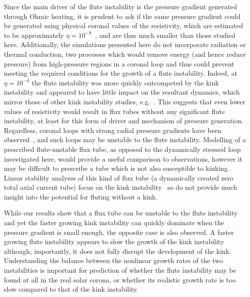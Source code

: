 \documentclass[fleqn,usenatbib]{mnras}
\newcommand{\rs}[2]{{#2}}
\begin{document}
Since the main driver of the \rs{fluting}{flute} instability is the
pressure gradient generated through Ohmic heating, it is prudent to
ask if the same pressure gradient could be generated using physical
coronal values of the resistivity, \rs{of}{which are estimated to be}
approximately
$\eta=10^{-8}$~\citep{craigAnisotropicViscousDissipation2009a},
\rs{which are}{and are thus} much smaller than those studied
here. Additionally, the simulations presented here do not incorporate
radiation or thermal \rs{conductivity}{conduction}, two processes which would remove
energy (and \rs{thus}{hence} reduce pressure) from high-pressure regions in a coronal
loop and thus could \rs{remove}{prevent meeting} the required
conditions for the growth of a 
\rs{fluting}{flute} instability. \rs{Where}{Indeed, at} $\eta=10^{-4}$ the
\rs{fluting}{flute} instability was \rs{}{more} quickly \rs{dominated}{outcompeted} by the kink
instability and appeared to have little impact on the resultant
dynamics, which mirror those of other kink instability studies, \rs{such
as~}{e.g.~}\citep{hoodCoronalHeatingMagnetic2009}. This suggests that even
lower values of resistivity would result in flux tubes without any
significant \rs{fluting}{flute} instability, at least for this form of
driver and mechanism of pressure generation. Regardless, coronal loops
with strong radial pressure gradients have been
observed~\citep{foukalTemperatureStructurePressure1975}, and such loops
may be unstable to the \rs{fluting}{flute} instability. Modelling of a
prescribed \rs{fluting}{flute}-unstable flux tube, as opposed to the dynamically
stressed loop investigated here, would provide a useful comparison to
observations, however it may be difficult to prescribe a tube which is
not also susceptible to kinking. Linear stability analyses of this
kind of flux tube (a dynamically created zero total axial current
tube) focus on the kink
instability~\citep{browningSolarCoronalHeating2003b} so do not provide
much insight into the potential for fluting without a kink. 

\rs{These}{While our} results show that a flux tube can be unstable to
the \rs{fluting}{flute} instability and yet the faster growing kink
instability can quickly dominate when the pressure gradient is small
enough\rs{. However}{}, the opposite case is also observed\rs{,
  where}{. A faster} growing \rs{fluting}{flute} instability appears to slow the growth of
the kink instability although, importantly, it does not fully disrupt
the development of the kink. Understanding the balance between the
nonlinear growth rates of the two instabilities is important \rs{in
understanding}{for prediction of} whether the \rs{fluting}{flute} instability may be found
at all in the real solar corona, or whether \rs{a}{its} realistic growth rate is
too slow compared to that of the kink instability. 
\end{document}
